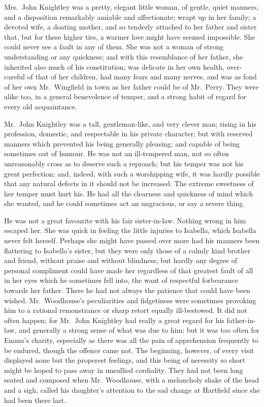 Mrs.\ John Knightley was a pretty, elegant little woman, of gentle,
quiet manners, and a disposition remarkably amiable and affectionate;
wrapt up in her family; a devoted wife, a doating mother,
and so tenderly attached to her father and sister that, but for
these higher ties, a warmer love might have seemed impossible.
She could never see a fault in any of them.  She was not a woman
of strong understanding or any quickness; and with this resemblance
of her father, she inherited also much of his constitution;
was delicate in her own health, over-careful of that of her children,
had many fears and many nerves, and was as fond of her own Mr.\ Wingfield
in town as her father could be of Mr.\ Perry.  They were alike too,
in a general benevolence of temper, and a strong habit of regard
for every old acquaintance.

Mr.\ John Knightley was a tall, gentleman-like, and very clever man;
rising in his profession, domestic, and respectable in his
private character; but with reserved manners which prevented his being
generally pleasing; and capable of being sometimes out of humour.
He was not an ill-tempered man, not so often unreasonably cross
as to deserve such a reproach; but his temper was not his
great perfection; and, indeed, with such a worshipping wife,
it was hardly possible that any natural defects in it should not
be increased.  The extreme sweetness of her temper must hurt his.
He had all the clearness and quickness of mind which she wanted,
and he could sometimes act an ungracious, or say a severe thing.

He was not a great favourite with his fair sister-in-law. Nothing
wrong in him escaped her.  She was quick in feeling the little
injuries to Isabella, which Isabella never felt herself.
Perhaps she might have passed over more had his manners been
flattering to Isabella's sister, but they were only those of a calmly
kind brother and friend, without praise and without blindness;
but hardly any degree of personal compliment could have made her
regardless of that greatest fault of all in her eyes which he sometimes
fell into, the want of respectful forbearance towards her father.
There he had not always the patience that could have been wished.
Mr.\ Woodhouse's peculiarities and fidgetiness were sometimes provoking
him to a rational remonstrance or sharp retort equally ill-bestowed.
It did not often happen; for Mr.\ John Knightley had really a great
regard for his father-in-law, and generally a strong sense of what was
due to him; but it was too often for Emma's charity, especially as
there was all the pain of apprehension frequently to be endured,
though the offence came not.  The beginning, however, of every visit
displayed none but the properest feelings, and this being of necessity
so short might be hoped to pass away in unsullied cordiality.
They had not been long seated and composed when Mr.\ Woodhouse,
with a melancholy shake of the head and a sigh, called his daughter's
attention to the sad change at Hartfield since she had been there last.

